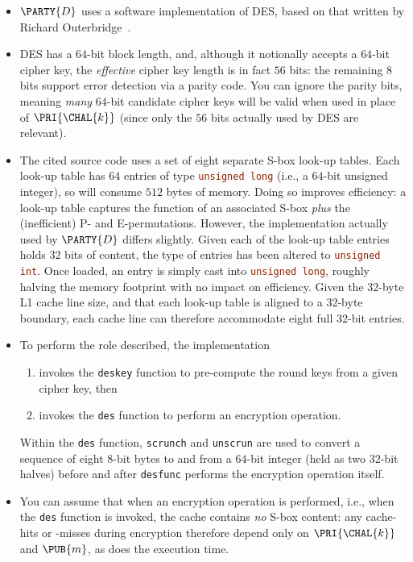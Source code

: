 \begin{itemize}
\item $\PARTY{D}$ uses a software implementation of DES, based on that
      written by Richard Outerbridge~\cite[Part V]{SCALE:Schneier:06}.
\item DES has a $64$-bit block length, and, although it notionally accepts 
      a $64$-bit cipher key, the {\em effective} cipher key length is in
      fact $56$ bits: the remaining $8$ bits support error detection via 
      a parity code.  You can ignore the parity bits, meaning {\em many}
      $64$-bit candidate cipher keys will be valid when used in place of 
      $\PRI{\CHAL{k}}$ (since only the $56$ bits actually used by DES are 
      relevant).
\item The cited source code uses a set of eight separate S-box look-up 
      tables.  Each look-up table has $64$ entries of type 
      \lstinline[language=C]{unsigned long} 
      (i.e., a $64$-bit unsigned integer), so will consume $512$ bytes 
      of memory.  Doing so improves efficiency: a look-up table captures 
      the function of an associated S-box {\em plus} the (inefficient) 
      P- and E-permutations.  However, the implementation actually used 
      by $\PARTY{D}$ differs slightly.  Given each of the look-up table 
      entries holds $32$ bits of content, the type of entries has been 
      altered to 
      \lstinline[language=C]{unsigned int}. 
      Once loaded, an entry is simply cast into 
      \lstinline[language=C]{unsigned long},
      roughly halving the memory footprint with no impact on efficiency.
      Given the $32$-byte L1 cache line size, and that each look-up table 
      is aligned to a $32$-byte boundary, each cache line can therefore 
      accommodate eight full $32$-bit entries.
\item To perform the role described, the implementation

      \begin{enumerate}
      \item invokes the \lstinline[language=C]{deskey} function
            to pre-compute the round keys from a given cipher key,
            then
      \item invokes the \lstinline[language=C]{des}    function
            to perform an encryption operation.
      \end{enumerate}

      \noindent
      Within the 
      \lstinline[language=C]{des}
      function, 
      \lstinline[language=C]{scrunch} and \lstinline[language=C]{unscrun}
      are used to convert a sequence of eight $8$-bit bytes to and from a
      $64$-bit integer (held as two $32$-bit halves) before and after 
      \lstinline[language=C]{desfunc}
      performs the encryption operation itself.
\item You can assume that when an encryption operation is performed, i.e.,
      when the
      \lstinline[language=C]{des}
      function is invoked, the cache contains {\em no} S-box content: any
      cache-hits or -misses during encryption therefore depend only on 
      $\PRI{\CHAL{k}}$ and $\PUB{m}$, as does the execution time.
\end{itemize}

